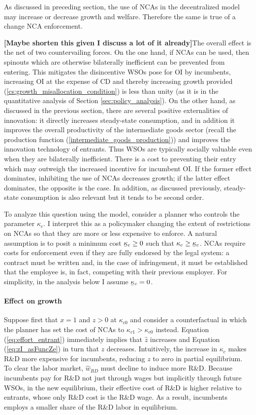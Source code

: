 \documentclass[11pt,english]{article}
\newcommand\munderbar[1]{%
	\underaccent{\bar}{#1}}
\begin{document}
As discussed in preceding section, the use of NCAs in the decentralized model may increase or decrease growth and welfare. Therefore the same is true of a change NCA enforcement. 

\textbf{[Maybe shorten this given I discuss a lot of it already]}The overall effect is the net of two countervailing forces. On the one hand, if NCAs can be used, then spinouts which are otherwise bilaterally inefficient can be prevented from entering. This mitigates the disincentive WSOs pose for OI by incumbents, increasing OI at the expense of CD and thereby increasing growth provided (\ref{cs:growth_misallocation_condition}) is less than unity (as it is in the quantitative analysis of Section \ref{sec:policy_analysis}). On the other hand, as discussed in the previous section, there are several positive externalities of innovation: it directly increases steady-state consumption, and in addition it improves the overall productivity of the intermediate goods sector (recall the production function (\ref{intermediate_goods_production})) and improves the innovation technology of entrants. Thus WSOs are typically socially valuable even when they are bilaterally inefficient. There is a cost to preventing their entry which may outweigh the increased incentive for incumbent OI. If the former effect dominates, inhibiting the use of NCAs decreases growth; if the latter effect dominates, the opposite is the case. In addition, as discussed previously, steady-state consumption is also relevant but it tends to be second order.

To analyze this question using the model, consider a planner who controls the parameter $\kappa_c$. I interpret this as a policymaker changing the extent of restrictions on NCAs so that they are more or less expensive to enforce. A natural assumption is to posit a minimum cost $\munderbar{\kappa}_c \ge 0$ such that $\kappa_c \ge \munderbar{\kappa}_c$. NCAs require costs for enforcement even if they are fully endorsed by the legal system: a contract must be written and, in the case of infringement, it must be established that the employee is, in fact, competing with their previous employer. For simplicity, in the analysis below I assume $\munderbar{\kappa}_c = 0$.

\paragraph{Effect on growth}

Suppose first that $x = 1$ and $z > 0$ at $\kappa_{c0}$ and consider a counterfactual in which the planner has set the cost of NCAs to $\kappa_{c1} > \kappa_{c0}$ instead. Equation (\ref{eq:effort_entrant}) immediately implies that $\hat{z}$ increases and Equation (\ref{eq:zI_asFuncZe}) in turn that $z$ decreases. Intuitively, the increase in $\kappa_c$ makes R\&D more expensive for incumbents, reducing $z$ to zero in partial equilibrium. To clear the labor market, $\hat{w}_{RD}$ must decline to induce more R\&D. Because incumbents pay for R\&D not just through wages but implicitly through future WSOs, in the new equilibrium, their effective cost of R\&D is higher relative to entrants, whose only R\&D cost is the R\&D wage. As a result, incumbents employs a smaller share of the R\&D labor in equilibrium.
\end{document}
